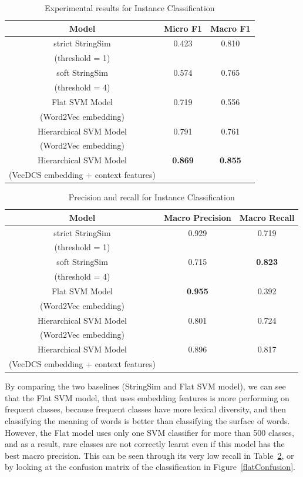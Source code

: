 \documentclass[12pt]{article}
\begin{document}
\begin{table}[!ht]
\center
\begin{tabular}{c||c|c}
	Model & Micro F1 & Macro F1 \\
	\hline
	\hline
	strict StringSim & 0.423 & 0.810 \\
	(threshold = 1) & & \\ \hline
	soft StringSim & 0.574 & 0.765 \\
	(threshold = 4) & & \\ \hline
	Flat SVM Model & 0.719 & 0.556 \\
	(Word2Vec embedding) & & \\ \hline
	Hierarchical SVM Model & 0.791 & 0.761\\
	(Word2Vec embedding) & & \\ \hline
	Hierarchical SVM Model & \textbf{0.869} & \textbf{0.855}\\
	(VecDCS embedding + context features) & & \\
\end{tabular}
\caption{\label{resultsInstanceClassification} Experimental results for Instance Classification}
\end{table}

\begin{table}[!ht]
\center
\begin{tabular}{c||c|c}
	Model & Macro Precision & Macro Recall \\
	\hline
	\hline
	strict StringSim & 0.929 & 0.719 \\
	(threshold = 1) & & \\ \hline
	soft StringSim & 0.715 & \textbf{0.823} \\
	(threshold = 4) & & \\ \hline
	Flat SVM Model & \textbf{0.955} & 0.392 \\
	(Word2Vec embedding) & & \\ \hline
	Hierarchical SVM Model & 0.801 & 0.724\\
	(Word2Vec embedding) & & \\ \hline
	Hierarchical SVM Model & 0.896 & 0.817\\
	(VecDCS embedding + context features) & & \\
\end{tabular}
\caption{\label{recallInstanceClassification} Precision and recall for Instance Classification}
\end{table}

By comparing the two baselines (StringSim and Flat SVM model), we can see that the Flat SVM model, that uses embedding features is more performing on frequent classes, because frequent classes have more lexical diversity, and then classifying the meaning of words is better than classifying the surface of words. However, the Flat model uses only one SVM classifier for more than 500 classes, and as a result, rare classes are not correctly learnt even if this model has the best macro precision. This can be seen through its very low recall in Table~\ref{recallInstanceClassification}, or by looking at the confusion matrix of the classification in Figure~\ref{flatConfusion}.\\
\end{document}
